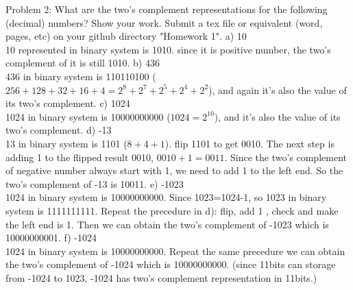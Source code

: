 \documentclass[a4paper,12pt]{article}
\begin{document}
\noindent Problem 2:   What are the two's complement representations for the following (decimal) numbers? Show your work. Submit a tex file or equivalent (word, pages, etc) on your github directory "Homework 1". 
\newline
\newline
a) 10\\
10 represented in binary system is 1010. since it is positive number, the two's complement of it is still 1010.
\newline
\newline
b) 436\\
436 in binary system is 110110100 ($256+128+32+16+4=2^8+2^7+2^5+2^4+2^2$), and again it's also the value of its two's complement.
\newline 
\newline 
c) 1024\\
1024 in binary system is 10000000000 ($1024=2^{10}$), and it's also the value of its two's complement.
\newline  
\newline
d) -13\\
13 in binary system is 1101 ($8+4+1$). flip 1101 to get 0010. The next step is adding 1 to the flipped result 0010, $0010+1=0011$. Since the two's complement of negative number always start with 1, we need to add 1 to the left end. So the  two's complement of -13 is 10011.
\newline 
\newline
e) -1023\\
1024 in binary system is 10000000000. Since 1023=1024-1, so 1023 in binary system is 1111111111. Repeat the precedure in d): flip, add 1 , check and make the left end is 1. Then we can obtain the two's complement of -1023 which is 10000000001.
\newline  
\newline
f) -1024\\
1024 in binary system is 10000000000. Repeat the same precedure we can obtain the two's complement of -1024 which is 10000000000. (since 11bits can storage from -1024 to 1023, -1024 has two's complement representation in 11bits.) 
\end{document}
